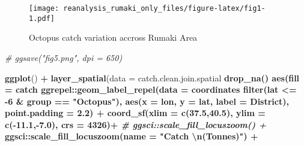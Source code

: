 \documentclass[
]{article}
\newenvironment{Shaded}{\begin{snugshade}}{\end{snugshade}}
\newcommand{\CharTok}[1]{\textcolor[rgb]{0.31,0.60,0.02}{#1}}
\newcommand{\CommentTok}[1]{\textcolor[rgb]{0.56,0.35,0.01}{\textit{#1}}}
\newcommand{\DataTypeTok}[1]{\textcolor[rgb]{0.13,0.29,0.53}{#1}}
\newcommand{\DecValTok}[1]{\textcolor[rgb]{0.00,0.00,0.81}{#1}}
\newcommand{\FloatTok}[1]{\textcolor[rgb]{0.00,0.00,0.81}{#1}}
\newcommand{\KeywordTok}[1]{\textcolor[rgb]{0.13,0.29,0.53}{\textbf{#1}}}
\newcommand{\NormalTok}[1]{#1}
\newcommand{\OperatorTok}[1]{\textcolor[rgb]{0.81,0.36,0.00}{\textbf{#1}}}
\newcommand{\StringTok}[1]{\textcolor[rgb]{0.31,0.60,0.02}{#1}}
\begin{document}
\begin{figure}
\centering
\texttt{[image: reanalysis\_rumaki\_only\_files/figure-latex/fig1-1.pdf]}
\caption{\label{fig:fig1}Octopus catch variation accross Rumaki Area}
\end{figure}

\begin{Shaded}
\begin{Highlighting}[]
 \CommentTok{# ggsave("fig5.png", dpi = 650)}
\end{Highlighting}
\end{Shaded}

\begin{Shaded}
\begin{Highlighting}[]
 \KeywordTok{ggplot}\NormalTok{() }\OperatorTok{+}
\StringTok{  }\KeywordTok{layer_spatial}\NormalTok{(}\DataTypeTok{data =}\NormalTok{ catch.clean.join.spatial }\OperatorTok{%>%}\StringTok{ }
\StringTok{                  }\KeywordTok{drop_na}\NormalTok{() }\OperatorTok{%>%}\StringTok{ }\KeywordTok{filter}\NormalTok{(group }\OperatorTok{==}\StringTok{ "Reef fish"}\NormalTok{),}
          \KeywordTok{aes}\NormalTok{(}\DataTypeTok{fill =}\NormalTok{ catch }\OperatorTok{%>%}\KeywordTok{as.factor}\NormalTok{()), }\DataTypeTok{col =} \StringTok{"ivory"}\NormalTok{)}\OperatorTok{+}
\StringTok{  }\NormalTok{ggrepel}\OperatorTok{::}\KeywordTok{geom_label_repel}\NormalTok{(}\DataTypeTok{data =}\NormalTok{ coordinates }\OperatorTok{%>%}\StringTok{ }
\StringTok{                              }\KeywordTok{filter}\NormalTok{(lat }\OperatorTok{<=}\StringTok{ }\DecValTok{-6} \OperatorTok{&}\StringTok{ }\NormalTok{group }\OperatorTok{==}\StringTok{ "Octopus"}\NormalTok{), }
                            \KeywordTok{aes}\NormalTok{(}\DataTypeTok{x =}\NormalTok{ lon, }\DataTypeTok{y =}\NormalTok{ lat, }\DataTypeTok{label =}\NormalTok{ District),}
                            \DataTypeTok{point.padding =} \FloatTok{2.2}\NormalTok{) }\OperatorTok{+}
\StringTok{  }\KeywordTok{coord_sf}\NormalTok{(}\DataTypeTok{xlim =} \KeywordTok{c}\NormalTok{(}\FloatTok{37.5}\NormalTok{,}\FloatTok{40.5}\NormalTok{), }\DataTypeTok{ylim =} \KeywordTok{c}\NormalTok{(}\OperatorTok{-}\FloatTok{11.1}\NormalTok{,}\OperatorTok{-}\FloatTok{7.0}\NormalTok{), }\DataTypeTok{crs =} \DecValTok{4326}\NormalTok{)}\OperatorTok{+}
\StringTok{  }\CommentTok{# ggsci::scale_fill_locuszoom() +}
\StringTok{  }\NormalTok{ggsci}\OperatorTok{::}\KeywordTok{scale_fill_locuszoom}\NormalTok{(}\DataTypeTok{name =} \StringTok{"Catch }\CharTok{\textbackslash{}n}\StringTok{(Tonnes)"}\NormalTok{) }\OperatorTok{+}
}}}}
\end{Highlighting}
\end{Shaded}
\end{document}
